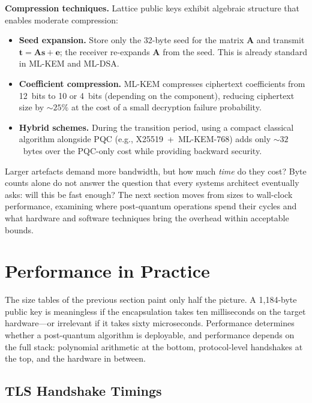 \textbf{Compression techniques.}  Lattice public keys exhibit algebraic structure that enables moderate compression:
\begin{itemize}
\item \textbf{Seed expansion.}  Store only the 32-byte seed for the matrix $\mathbf{A}$ and transmit $\mathbf{t} = \mathbf{A}\mathbf{s} + \mathbf{e}$; the receiver re-expands $\mathbf{A}$ from the seed.  This is already standard in ML-KEM and ML-DSA.
\item \textbf{Coefficient compression.}  ML-KEM compresses ciphertext coefficients from 12~bits to 10 or 4~bits (depending on the component), reducing ciphertext size by $\sim\!25\%$ at the cost of a small decryption failure probability.
\item \textbf{Hybrid schemes.}  During the transition period, using a compact classical algorithm alongside PQC (e.g., X25519~+~ML-KEM-768) adds only $\sim\!32$~bytes over the PQC-only cost while providing backward security.
\end{itemize}

Larger artefacts demand more bandwidth, but how much \emph{time} do they cost?  Byte counts alone do not answer the question that every systems architect eventually asks: will this be fast enough?  The next section moves from sizes to wall-clock performance, examining where post-quantum operations spend their cycles and what hardware and software techniques bring the overhead within acceptable bounds.


\section{Performance in Practice}
\label{sec:performance}

The size tables of the previous section paint only half the picture.  A 1{,}184-byte public key is meaningless if the encapsulation takes ten milliseconds on the target hardware---or irrelevant if it takes sixty microseconds.  Performance determines whether a post-quantum algorithm is deployable, and performance depends on the full stack: polynomial arithmetic at the bottom, protocol-level handshakes at the top, and the hardware in between.

\subsection{TLS Handshake Timings}
\label{subsec:tls-timings}

